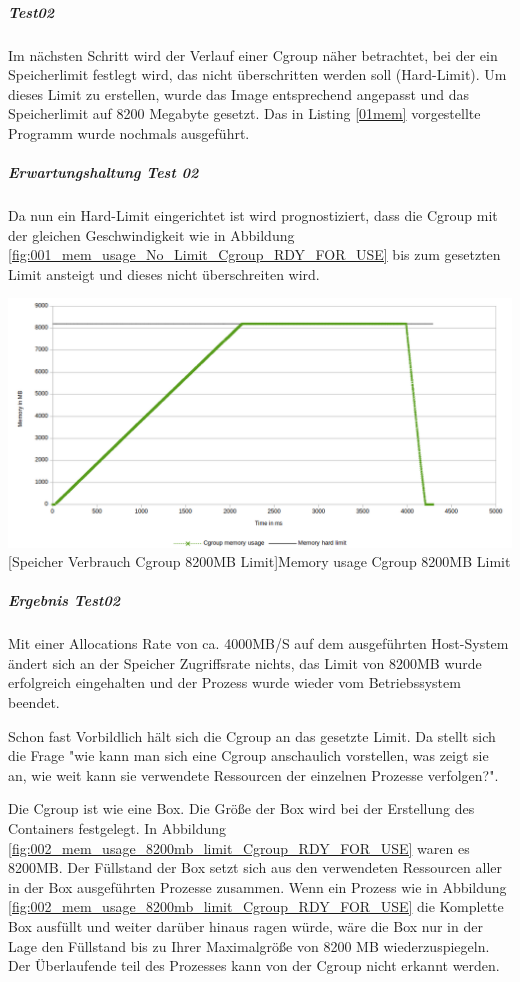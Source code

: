 \subparagraph{Test02}
Im nächsten Schritt wird der Verlauf einer Cgroup näher betrachtet, bei der ein Speicherlimit festlegt wird, das nicht überschritten werden soll (Hard-Limit). Um dieses Limit zu erstellen, wurde das Image entsprechend angepasst und das Speicherlimit auf 8200 Megabyte gesetzt. Das in Listing \ref{01mem} vorgestellte Programm wurde nochmals ausgeführt.

\subparagraph{Erwartungshaltung Test 02}
Da nun ein Hard-Limit eingerichtet ist wird prognostiziert, dass die Cgroup mit der gleichen Geschwindigkeit wie in Abbildung \ref{fig:001_mem_usage_No_Limit_Cgroup_RDY_FOR_USE} bis zum gesetzten Limit ansteigt und dieses nicht überschreiten wird. 

\vspace{1em}
\begin{minipage}{\linewidth}
	\centering
	\includegraphics[width=1\linewidth]{pics/002_mem_usage_8200mb_limit_Cgroup_RDY_FOR_USE.png}
	[Speicher Verbrauch Cgroup 8200MB Limit]{Memory usage Cgroup 8200MB Limit}
	\label{fig:002_mem_usage_8200mb_limit_Cgroup_RDY_FOR_USE}
\end{minipage}

\subparagraph{Ergebnis Test02}
Mit einer Allocations Rate von ca. 4000MB/S auf dem ausgeführten Host-System ändert sich an der Speicher Zugriffsrate nichts, das Limit von 8200MB wurde erfolgreich eingehalten und der Prozess wurde wieder vom Betriebssystem beendet.

Schon fast Vorbildlich hält sich die Cgroup an das gesetzte Limit. Da stellt sich die Frage "wie kann man sich eine Cgroup anschaulich vorstellen, was zeigt sie an, wie weit kann sie verwendete Ressourcen der einzelnen Prozesse verfolgen?". 


Die Cgroup ist wie eine Box. Die Größe der Box wird bei der Erstellung des Containers festgelegt. In Abbildung \ref{fig:002_mem_usage_8200mb_limit_Cgroup_RDY_FOR_USE} waren es 8200MB. Der Füllstand der Box setzt sich aus den verwendeten Ressourcen aller in der Box ausgeführten Prozesse zusammen. Wenn ein Prozess wie in Abbildung \ref{fig:002_mem_usage_8200mb_limit_Cgroup_RDY_FOR_USE} die Komplette Box ausfüllt und weiter darüber hinaus ragen würde, wäre die Box nur in der Lage den Füllstand bis zu Ihrer Maximalgröße von 8200 MB wiederzuspiegeln. Der Überlaufende teil des Prozesses kann von der Cgroup nicht erkannt werden.

